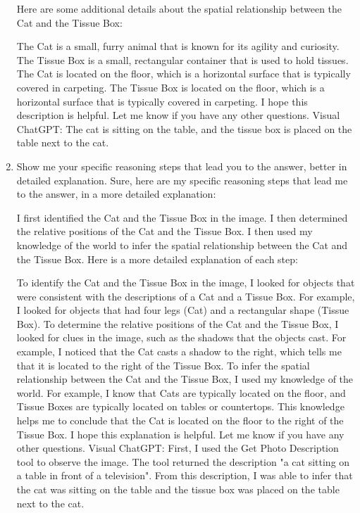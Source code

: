 \begin{enumerate}
    Here are some additional details about the spatial relationship between the Cat and the Tissue Box:
    
    The Cat is a small, furry animal that is known for its agility and curiosity.
    The Tissue Box is a small, rectangular container that is used to hold tissues.
    The Cat is located on the floor, which is a horizontal surface that is typically covered in carpeting.
    The Tissue Box is located on the floor, which is a horizontal surface that is typically covered in carpeting.
    I hope this description is helpful. Let me know if you have any other questions.
    \subitem Visual ChatGPT: The cat is sitting on the table, and the tissue box is placed on the table next to the cat.
    \item Show me your specific reasoning steps that lead you to the answer, better in detailed explanation.
    \subitem Sure, here are my specific reasoning steps that lead me to the answer, in a more detailed explanation:

    I first identified the Cat and the Tissue Box in the image.
    I then determined the relative positions of the Cat and the Tissue Box.
    I then used my knowledge of the world to infer the spatial relationship between the Cat and the Tissue Box.
    Here is a more detailed explanation of each step:
    
    To identify the Cat and the Tissue Box in the image, I looked for objects that were consistent with the descriptions of a Cat and a Tissue Box. For example, I looked for objects that had four legs (Cat) and a rectangular shape (Tissue Box).
    To determine the relative positions of the Cat and the Tissue Box, I looked for clues in the image, such as the shadows that the objects cast. For example, I noticed that the Cat casts a shadow to the right, which tells me that it is located to the right of the Tissue Box.
    To infer the spatial relationship between the Cat and the Tissue Box, I used my knowledge of the world. For example, I know that Cats are typically located on the floor, and Tissue Boxes are typically located on tables or countertops. This knowledge helps me to conclude that the Cat is located on the floor to the right of the Tissue Box.
    I hope this explanation is helpful. Let me know if you have any other questions.
    \subitem Visual ChatGPT: First, I used the Get Photo Description tool to observe the image. The tool returned the description "a cat sitting on a table in front of a television". From this description, I was able to infer that the cat was sitting on the table and the tissue box was placed on the table next to the cat.
\end{enumerate}
